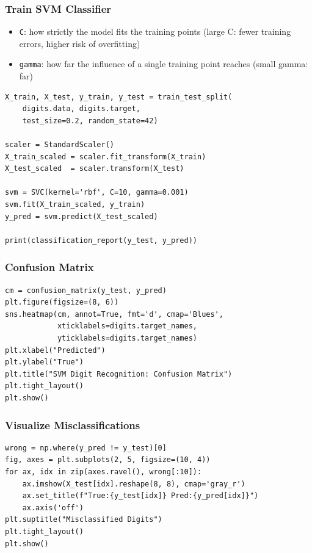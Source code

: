 \begin{frame}[fragile]\frametitle{Train SVM Classifier}
\begin{itemize}
\item \texttt{C}: how strictly the model fits the training points (large C: fewer training errors, higher risk of overfitting)
\item \texttt{gamma}: how far the influence of a single training point reaches (small gamma: far)
\end{itemize}
\begin{lstlisting}
X_train, X_test, y_train, y_test = train_test_split(
    digits.data, digits.target,
    test_size=0.2, random_state=42)

scaler = StandardScaler()
X_train_scaled = scaler.fit_transform(X_train)
X_test_scaled  = scaler.transform(X_test)

svm = SVC(kernel='rbf', C=10, gamma=0.001)
svm.fit(X_train_scaled, y_train)
y_pred = svm.predict(X_test_scaled)

print(classification_report(y_test, y_pred))
\end{lstlisting}
\end{frame}

\begin{frame}[fragile]\frametitle{Confusion Matrix}
\begin{lstlisting}
cm = confusion_matrix(y_test, y_pred)
plt.figure(figsize=(8, 6))
sns.heatmap(cm, annot=True, fmt='d', cmap='Blues',
            xticklabels=digits.target_names,
            yticklabels=digits.target_names)
plt.xlabel("Predicted")
plt.ylabel("True")
plt.title("SVM Digit Recognition: Confusion Matrix")
plt.tight_layout()
plt.show()
\end{lstlisting}
\end{frame}

\begin{frame}[fragile]\frametitle{Visualize Misclassifications}
\begin{lstlisting}
wrong = np.where(y_pred != y_test)[0]
fig, axes = plt.subplots(2, 5, figsize=(10, 4))
for ax, idx in zip(axes.ravel(), wrong[:10]):
    ax.imshow(X_test[idx].reshape(8, 8), cmap='gray_r')
    ax.set_title(f"True:{y_test[idx]} Pred:{y_pred[idx]}")
    ax.axis('off')
plt.suptitle("Misclassified Digits")
plt.tight_layout()
plt.show()
\end{lstlisting}
\end{frame}

